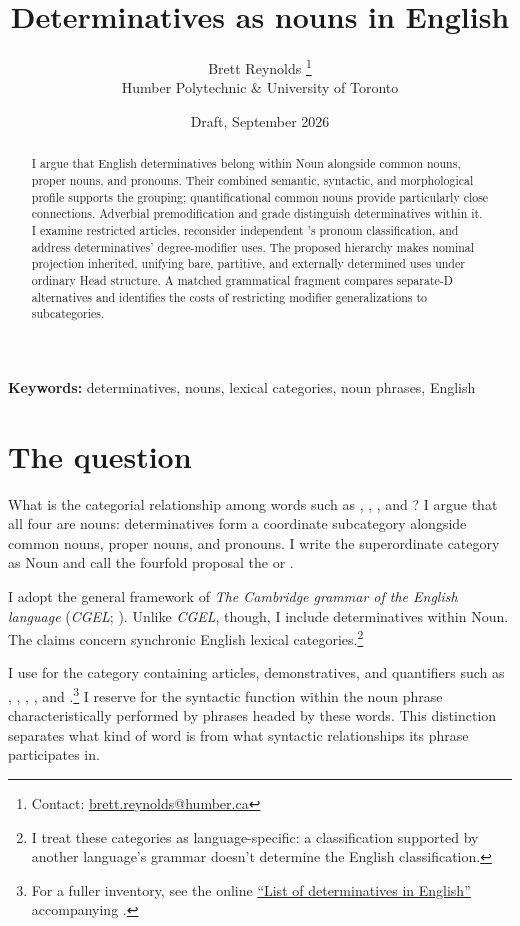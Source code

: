 \documentclass[12pt]{article}
\title{Determinatives as nouns in English}
\author{Brett Reynolds \orcidlink{0000-0003-0073-7195}%
\thanks{Contact: \href{mailto:brett.reynolds@humber.ca}{brett.reynolds@humber.ca}}\\
Humber Polytechnic \& University of Toronto}
\date{Draft, September 2026}
\begin{document}
\maketitle

\begin{abstract}
I argue that English determinatives belong within Noun alongside common nouns, proper nouns, and pronouns. Their combined semantic, syntactic, and morphological profile supports the grouping; quantificational common nouns provide particularly close connections. Adverbial premodification and grade distinguish determinatives within it. I examine restricted articles, reconsider independent 's pronoun classification, and address determinatives' degree-modifier uses. The proposed hierarchy makes nominal projection inherited, unifying bare, partitive, and externally determined uses under ordinary Head structure. A matched grammatical fragment compares separate-D alternatives and identifies the costs of restricting modifier generalizations to subcategories.
\end{abstract}

\noindent\textbf{Keywords:} determinatives, nouns, lexical categories, noun phrases, English

\section{The question}\label{sec:intro}

What is the categorial relationship among words such as , , , and ? I argue that all four are nouns: determinatives form a coordinate subcategory alongside common nouns, proper nouns, and pronouns. I write the superordinate category as Noun and call the fourfold proposal the  or .

I adopt the general framework of \textit{The Cambridge grammar of the English language} (\textit{CGEL}; \citealt{huddleston2002}). Unlike \textit{CGEL}, though, I include determinatives within Noun. The claims concern synchronic English lexical categories.\footnote{I treat these categories as language-specific: a classification supported by another language's grammar doesn't determine the English classification.}

I use  for the category containing articles, demonstratives, and quantifiers such as , , , , and .\footnote{For a fuller inventory, see the online \href{https://www.cambridge.org/highereducation/api/resources/2AC8DF5CA558F8A6FCDFACD0EAF8EA08}{\enquote{List of determinatives in English}} accompanying \textcite{Huddleston2021}.} I reserve  for the syntactic function within the noun phrase characteristically performed by phrases headed by these words. This distinction separates what kind of word  is from what syntactic relationships its phrase participates in.
\end{document}

